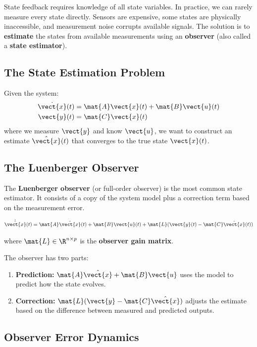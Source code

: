 State feedback requires knowledge of all state variables. In practice, we can rarely measure every state directly. Sensors are expensive, some states are physically inaccessible, and measurement noise corrupts available signals. The solution is to \textbf{estimate} the states from available measurements using an \textbf{observer} (also called a \textbf{state estimator}).

\subsection{The State Estimation Problem}

Given the system:
\begin{align}
\dot{\vect{x}}(t) &= \mat{A}\vect{x}(t) + \mat{B}\vect{u}(t) \\
\vect{y}(t) &= \mat{C}\vect{x}(t)
\end{align}
where we measure $\vect{y}$ and know $\vect{u}$, we want to construct an estimate $\hat{\vect{x}}(t)$ that converges to the true state $\vect{x}(t)$.

\subsection{The Luenberger Observer}

The \textbf{Luenberger observer} (or full-order observer) is the most common state estimator. It consists of a copy of the system model plus a correction term based on the measurement error.

\begin{equation}
\dot{\hat{\vect{x}}}(t) = \mat{A}\hat{\vect{x}}(t) + \mat{B}\vect{u}(t) + \mat{L}(\vect{y}(t) - \mat{C}\hat{\vect{x}}(t))
\label{eq:luenberger_observer}
\end{equation}

where $\mat{L} \in \R^{n \times p}$ is the \textbf{observer gain matrix}.

The observer has two parts:
\begin{enumerate}
    \item \textbf{Prediction:} $\mat{A}\hat{\vect{x}} + \mat{B}\vect{u}$ uses the model to predict how the state evolves.
    \item \textbf{Correction:} $\mat{L}(\vect{y} - \mat{C}\hat{\vect{x}})$ adjusts the estimate based on the difference between measured and predicted outputs.
\end{enumerate}

\subsection{Observer Error Dynamics}

